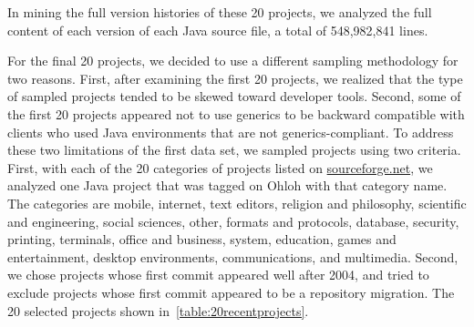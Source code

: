 \documentclass{svjour3}
\newcommand{\bbssh}{\textsc{BBSSH}\xspace}
\newcommand{\ehcache}{\textsc{Ehcache}\xspace}
\newcommand{\encuestame}{\textsc{encuestame}\xspace}
\newcommand{\flowgame}{\textsc{flowgame}\xspace}
\newcommand{\hummingbird}{\textsc{Hummingbird}\xspace}
\newcommand{\ice}{\textsc{ice4j}\xspace}
\newcommand{\libgdx}{\textsc{libgdx}\xspace}
\newcommand{\makagiga}{\textsc{Makagiga}\xspace}
\newcommand{\migen}{\textsc{MiGen}\xspace}
\newcommand{\mobac}{\textsc{MOBAC}\xspace}
\newcommand{\pathvisio}{\textsc{PathVisio}\xspace}
\newcommand{\posterita}{\textsc{Posterita}\xspace}
\newcommand{\opensso}{\textsc{OpenSSO}\xspace}
\newcommand{\smslib}{\textsc{SMSLib}\xspace}
\newcommand{\scsreader}{\textsc{SCSReader}\xspace}
\newcommand{\religion}{\textsc{Religion Search}\xspace}
\newcommand{\red}{\textsc{Red5}\xspace}
\newcommand{\vietocr}{\textsc{VietOCR}\xspace}
\newcommand{\xbup}{\textsc{XBUP}\xspace}
\newcommand{\zkdesktop}{\textsc{Zero Kelvin Desktop}\xspace}
\begin{document}
In mining the full version histories of these 20 projects, we analyzed
the full content of each version of each Java source file, a total of
548,982,841 lines.

For the final 20 projects, we decided to use a different sampling methodology for
two reasons.
First, after examining the first 20 projects, we realized that the type of sampled
projects tended to be skewed toward developer tools.
Second, some of the first 20 projects appeared not to use generics to be backward
compatible with clients who used Java environments that are not generics-compliant.
To address these two limitations of the first data set, we sampled projects using
two criteria.
First, with each of the 20 categories of projects listed on \url{sourceforge.net},
we analyzed one Java project that was tagged on Ohloh with that category name.
The categories are mobile, internet, text editors, religion and philosophy,
scientific and engineering, social sciences, other, formats and protocols,
database, security, printing, terminals, office and business, system,
education, games and entertainment, desktop environments, communications,
and multimedia.
Second, we chose projects whose first commit appeared well after 2004, and
tried to exclude projects whose first commit appeared to be a repository migration.
The 20 selected projects shown in~\autoref{table:20recentprojects}.
\end{document}
